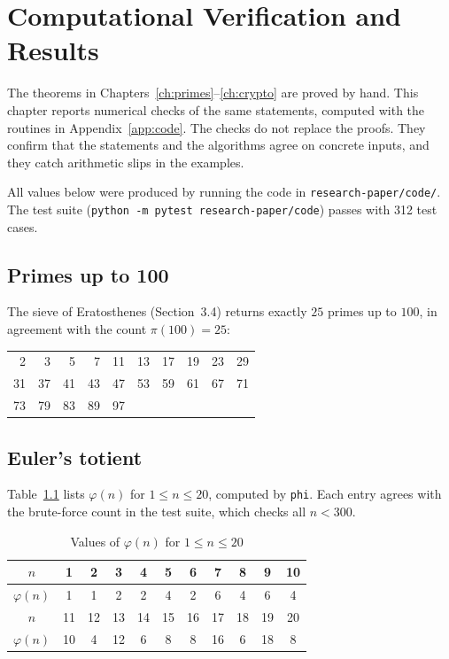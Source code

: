 \chapter{Computational Verification and Results}\label{ch:results}

The theorems in Chapters~\ref{ch:primes}--\ref{ch:crypto} are proved by hand. This chapter reports numerical checks of the same statements, computed with the routines in Appendix~\ref{app:code}. The checks do not replace the proofs. They confirm that the statements and the algorithms agree on concrete inputs, and they catch arithmetic slips in the examples.

All values below were produced by running the code in \texttt{research-paper/code/}. The test suite (\texttt{python -m pytest research-paper/code}) passes with 312 test cases.

\section{Primes up to 100}

The sieve of Eratosthenes (Section~3.4) returns exactly $25$ primes up to $100$, in agreement with the count $\pi(100)=25$:
\begin{center}
\begin{tabular}{rrrrrrrrrr}
2 & 3 & 5 & 7 & 11 & 13 & 17 & 19 & 23 & 29\\
31 & 37 & 41 & 43 & 47 & 53 & 59 & 61 & 67 & 71\\
73 & 79 & 83 & 89 & 97 & & & & &
\end{tabular}
\end{center}

\section{Euler's totient}

Table~\ref{tab:phi} lists $\varphi(n)$ for $1\le n\le 20$, computed by \texttt{phi}. Each entry agrees with the brute-force count in the test suite, which checks all $n<300$.

\begin{table}[h]
\centering
\caption{Values of $\varphi(n)$ for $1\le n\le 20$}\label{tab:phi}
\begin{tabular}{c|cccccccccc}
$n$ & 1 & 2 & 3 & 4 & 5 & 6 & 7 & 8 & 9 & 10\\\hline
$\varphi(n)$ & 1 & 1 & 2 & 2 & 4 & 2 & 6 & 4 & 6 & 4\\\hline
$n$ & 11 & 12 & 13 & 14 & 15 & 16 & 17 & 18 & 19 & 20\\\hline
$\varphi(n)$ & 10 & 4 & 12 & 6 & 8 & 8 & 16 & 6 & 18 & 8
\end{tabular}
\end{table}

